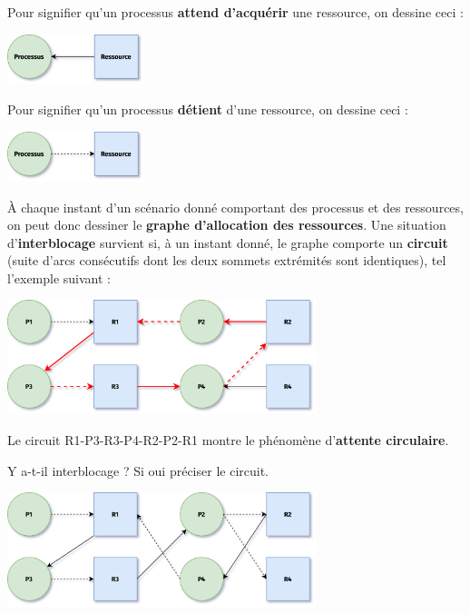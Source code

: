 \documentclass[a4paper,12pt,french]{book}
\begin{document}

Pour signifier qu'un processus \textbf{attend d'acquérir} une ressource, on dessine ceci :
\begin{center}
\includegraphics[width=4cm]{img/d1}
\end{center}

Pour signifier qu'un processus \textbf{détient} d'une ressource, on dessine ceci :
\begin{center}
\includegraphics[width=4cm]{img/d2}
\end{center}

À chaque instant d'un scénario donné comportant des processus et des ressources, on peut donc dessiner le \textbf{graphe d'allocation des ressources}.
Une situation d'\textbf{interblocage} survient si, à un instant donné, le graphe comporte un \textbf{circuit} (suite d'arcs consécutifs dont les deux sommets extrémités sont identiques), tel l'exemple suivant :

\begin{center}
\includegraphics[width=9cm]{img/d5}
\end{center}
Le circuit R1-P3-R3-P4-R2-P2-R1 montre le phénomène d'\textbf{attente circulaire}.

\begin{exercice}[]
Y a-t-il interblocage ? Si oui préciser le circuit.
\begin{center}
\includegraphics[width=9cm]{img/d3}
\end{center}
\end{exercice}
\end{document}
